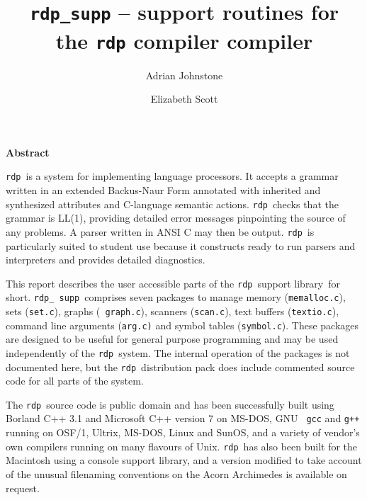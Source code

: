 \renewcommand{\today}{December 20, 1997}
\newcommand{\rdpsupp}{{\tt rdp\_\,supp}}
\newcommand{\rdp}{{\mediumseries\tt rdp}}
\title{{\tt \rdp\_supp} -- support routines for\\the {\tt\mediumseries rdp} compiler
compiler}
\author{Adrian Johnstone \and Elizabeth Scott}

\makecstitle %
\thispagestyle{empty}
\vspace*{1cm}
\begin{center}\bf Abstract\end{center}


\rdp\ is a system for implementing language processors. It accepts a
grammar written in an extended Backus-Naur Form annotated with inherited
and synthesized attributes and C-language semantic actions. \rdp\ checks
that the grammar is LL(1), providing detailed error messages pinpointing
the source of any problems. A parser written in ANSI C may then be
output. \rdp\ is particularly suited to student use because it
constructs ready to run parsers and interpreters and provides detailed
diagnostics. 

This report describes the user accessible parts of the \rdp\ support
library\dash \rdpsupp\ for short. \rdpsupp\ comprises seven packages to
manage memory ({\tt memalloc.c}), sets ({\tt set.c}), graphs ({\tt
graph.c}),  scanners ({\tt scan.c}), text buffers ({\tt textio.c}),
command line arguments ({\tt arg.c)} and symbol tables ({\tt symbol.c}).
These packages are designed to be useful for general purpose programming
and may be used independently of the \rdp\ system. The internal
operation of the packages is not documented here, but the \rdp\ distribution pack
does include commented source code for all parts of the system.

The \rdp\ source code is public domain and has been successfully built
using Borland C++ 3.1 and Microsoft C++ version 7 on MS-DOS, GNU {\tt
gcc} and {\tt g++} running on OSF/1, Ultrix, MS-DOS, Linux and SunOS,
and a variety of vendor's own compilers running on many flavours of
Unix. \rdp\ has also been built for the Macintosh using a console
support library, and a version modified to take account of the unusual
filenaming conventions on the Acorn Archimedes is available on request.

